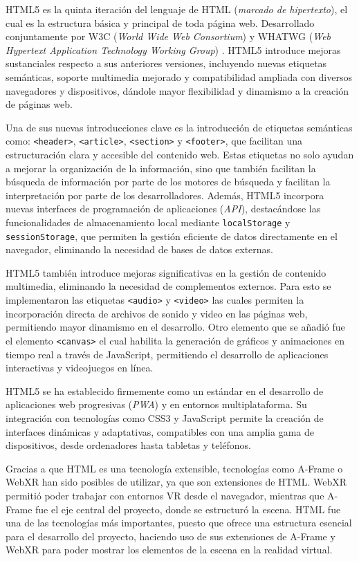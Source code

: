 \documentclass[a4paper, 12pt]{book}
\begin{document}
HTML5 \cite{freeman2018head} es la quinta iteración del lenguaje de HTML (\textit{marcado de hipertexto}), el cual es la estructura básica y principal de toda página web.
Desarrollado conjuntamente por W3C (\textit{World Wide Web Consortium}) \cite{w3c_mission} y WHATWG (\textit{Web Hypertext Application Technology Working Group}) \cite{whatwg}.
HTML5 introduce mejoras sustanciales respecto a sus anteriores versiones, incluyendo nuevas etiquetas semánticas, soporte multimedia mejorado y compatibilidad
ampliada con diversos navegadores y dispositivos, dándole mayor flexibilidad y dinamismo a la creación de páginas web.

Una de sus nuevas introducciones clave es la introducción de etiquetas semánticas como: \texttt{<header>}, \texttt{<article>}, \texttt{<section>} y \texttt{<footer>},
que facilitan una estructuración clara y accesible del contenido web. Estas etiquetas no solo ayudan a mejorar la organización de la información, sino que también facilitan la búsqueda
de información por parte de los motores de búsqueda y facilitan la interpretación por parte de los desarrolladores.
Además, HTML5 incorpora nuevas interfaces de programación de aplicaciones (\textit{API}), destacándose las funcionalidades de almacenamiento local mediante
\texttt{localStorage} y \texttt{sessionStorage}, que permiten la gestión eficiente de datos directamente en el navegador, eliminando la necesidad de bases de datos externas.

HTML5 también introduce mejoras significativas en la gestión de contenido multimedia, eliminando la necesidad de complementos externos. Para esto se implementaron
las etiquetas \texttt{<audio>} y \texttt{<video>} las cuales permiten la incorporación directa de archivos de sonido y video en las páginas web, permitiendo mayor dinamismo en el desarrollo.
Otro elemento que se añadió fue el elemento \texttt{<canvas>} el cual habilita la generación de gráficos y animaciones en tiempo real a través de JavaScript, permitiendo el desarrollo de aplicaciones interactivas y videojuegos en línea.

HTML5 se ha establecido firmemente como un estándar en el desarrollo de aplicaciones web progresivas (\textit{PWA}) y en entornos multiplataforma. Su integración con tecnologías como CSS3 y JavaScript
permite la creación de interfaces dinámicas y adaptativas, compatibles con una amplia gama de dispositivos, desde ordenadores hasta tabletas y teléfonos.

Gracias a que HTML es una tecnología extensible, tecnologías como A-Frame o WebXR han sido posibles de utilizar, ya que son extensiones de HTML. WebXR permitió poder trabajar con entornos VR desde el navegador, mientras que A-Frame fue el eje central 
del proyecto, donde se estructuró la escena. HTML fue una de las tecnologías más importantes, puesto que ofrece una estructura esencial para el desarrollo del proyecto, haciendo uso de sus extensiones de A-Frame y WebXR para poder mostrar los elementos de la escena en la realidad virtual.
\end{document}

